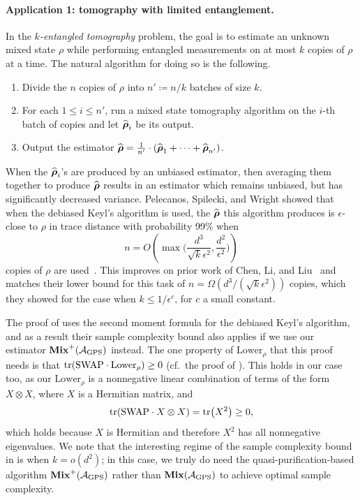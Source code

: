 \documentclass{article}
\newcommand{\mixed}{\textup{\textbf{Mix}}}
\newcommand{\gps}{\calA_{\mathrm{GPS}}}
\newcommand{\swap}{\mathrm{SWAP}}
\begin{document}
\paragraph{Application 1: tomography with limited entanglement.}
In the \emph{$k$-entangled tomography} problem, the goal is to estimate an unknown mixed state $\rho$ while performing entangled measurements on at most $k$ copies of $\rho$ at a time. 
The natural algorithm for doing so is the following.
\begin{enumerate}
    \item Divide the $n$ copies of $\rho$ into $n' \coloneqq n/k$ batches of size $k$.
    \item For each $1 \leq i \leq n'$, run a mixed state tomography algorithm on the $i$-th batch of copies and let $\widehat{\boldsymbol{\rho}}_i$ be its output.
    \item Output the estimator $\widehat{\boldsymbol{\rho}} = \frac{1}{n'} \cdot (\widehat{\boldsymbol{\rho}}_1 + \cdots + \widehat{\boldsymbol{\rho}}_{n'})$.
\end{enumerate}
When the $\widehat{\boldsymbol{\rho}}_i$'s are produced by an unbiased estimator,
then averaging them together to produce $\widehat{\boldsymbol{\rho}}$ results in an estimator which remains unbiased, but has significantly decreased variance.
Pelecanos, Spilecki, and Wright showed that when the debiased Keyl's algorithm is used, the $\widehat{\boldsymbol{\rho}}$ this algorithm produces is $\epsilon$-close to $\rho$ in trace distance with probability 99\% when
    \begin{equation}\label{eq:limited-entanglement-bound}
            n =O\left(\max \Big(\frac{d^3}{\sqrt{k}\epsilon^2}, \frac{d^2}{\epsilon^2} \Big) \right)
    \end{equation}
copies of $\rho$ are used~\cite[Theorem 1.8]{PSW25}.
This improves on prior work of Chen, Li, and Liu~\cite{CLL24a} and matches their lower bound for this task of $n = \Omega(d^3/(\sqrt{k} \epsilon^2))$ copies, which they showed for the case when $k \leq 1/\epsilon^c$, for $c$ a small constant. 

The proof of \cite{PSW25} uses the second moment formula for the debiased Keyl's algorithm,
and as a result their sample complexity bound also applies if we use our estimator $\mixed^+(\gps)$ instead.
The one property of $\mathrm{Lower}_{\rho}$ that this proof needs is that $\tr(\swap \cdot \mathrm{Lower}_{\rho}) \geq 0$ (cf.\ the proof of \cite[Lemma 4.2]{PSW25}).
This holds in our case too, as our $\mathrm{Lower}_{\rho}$ is a nonnegative linear combination of terms of the form $X \otimes X$, where $X$ is a Hermitian matrix,
and
\begin{equation*}
    \tr(\swap \cdot X \otimes X)
    = \tr(X^2)
    \geq 0,
\end{equation*}
which holds because $X$ is Hermitian and therefore $X^2$ has all nonnegative eigenvalues.
We note that the interesting regime of the sample complexity bound in  is when $k = o(d^2)$;
in this case, we truly do need the quasi-purification-based algorithm $\mixed^+(\gps)$ rather than $\mixed(\gps)$ to achieve optimal sample complexity.
\end{document}

